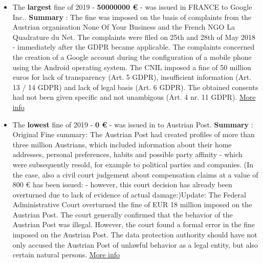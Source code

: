 \documentclass[12pt]{article}
\begin{document}
\newpage
\justify
	\begin{multicols}{2}
	\raggedright{}
		\begin{itemize}
			\item The \textbf{largest} fine of 2019 - \textbf{50000000 €} - was issued in FRANCE to Google Inc..
			\newline
			\textbf{Summary} : The fine was imposed on the basis of complaints from the Austrian organisation None Of Your Business and the French NGO La Quadrature du Net. The complaints were filed on 25th and 28th of May 2018 - immediately after the GDPR became applicable. The complaints concerned the creation of a Google account during the configuration of a mobile phone using the Android operating system. The CNIL imposed a fine of 50 million euros for lack of transparency (Art. 5 GDPR), insufficient information (Art. 13 / 14 GDPR) and lack of legal basis (Art. 6 GDPR). The obtained consents had not been given specific and not unambigous (Art. 4 nr. 11 GDPR).
			\newline
			\href{https://www.cnil.fr/en/cnils-restricted-committee-imposes-financial-penalty-50-million-euros-against-google-llc}{More info}
			\vspace{1cm}
		
			\item The \textbf{lowest} fine of 2019 - \textbf{0 €} - was issued in  to Austrian Post.
			\newline
			\textbf{Summary} : Original Fine summary: The Austrian Post had created profiles of more than three million Austrians, which included information about their home addresses, personal preferences, habits and possible party affinity - which were subsequently resold, for example to political parties and companies. (In the case, also a civil court judgement about compensation claims at a value of 800 € has been issued: - however, this court decision has already been overturned due to lack of evidence of actual damage:)Update: The Federal Administrative Court overturned the fine of EUR 18 million imposed on the Austrian Post. The court generally confirmed that the behavior of the Austrian Post was illegal. However, the court found a formal error in the fine imposed on the Austrian Post. The data protection authority should have not only accused the Austrian Post of unlawful behavior as a legal entity, but also certain natural persons.
			\newline
			\href{https://wien.orf.at/stories/3019396/}{More info}
		\end{itemize}
	\end{multicols}
\end{document}
